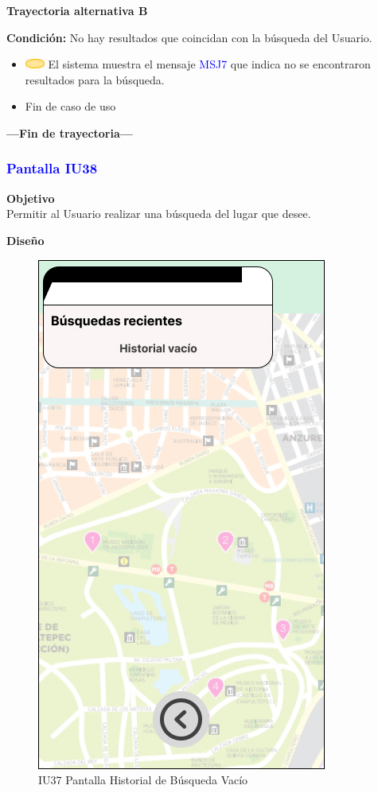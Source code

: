 \textbf{Trayectoria alternativa B}
\vspace{10pt}

\textbf{Condición:} No hay resultados que coincidan con la búsqueda del Usuario.
\begin{itemize}
    \item \includegraphics[width=0.0500\textwidth]{Figuras/sistema.png} El sistema muestra el mensaje \textcolor{blue}{MSJ7} que indica no se encontraron resultados para la búsqueda.
    \item Fin de caso de uso
\end{itemize}
\textbf{---Fin de trayectoria---}

\subsubsection{\textcolor{blue}{Pantalla IU38}}

\textbf{Objetivo} \\
Permitir al Usuario realizar una búsqueda del lugar que desee.
\vspace{15pt}

\textbf{Diseño}

    \begin{figure}[h]
        
            \centering
            \includegraphics[width=.4\linewidth]{Pantallas Prototipo3/IU37-Historial de Búsqueda Vacío.jpg}
        \caption{IU37 Pantalla Historial de Búsqueda Vacío}
    
    \end{figure}

